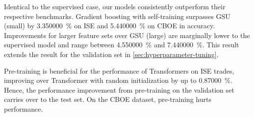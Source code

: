 Identical to the supervised case, our models consistently outperform their respective benchmarks. Gradient boosting with self-training surpasses \gls{GSU} (small) by \SI{3.350000}{\percent} on \gls{ISE} and \SI{5.440000}{\percent} on \gls{CBOE} in accuracy. Improvements for larger feature sets over \gls{GSU} (large) are marginally lower to the supervised model and range between \SI{4.550000}{\percent} and \SI{7.440000}{\percent}. This result extends the result for the validation set in \cref{sec:hyperparameter-tuning}.

Pre-training is beneficial for the performance of Transformers on \gls{ISE} trades, improving over Transformer with random initialization by up to \SI{0.87000}{\percent}. Hence, the performance improvement from pre-training on the validation set carries over to the test set. On the \gls{CBOE} dataset, pre-training hurts performance.

